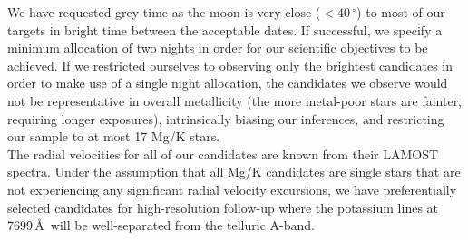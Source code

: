 \documentclass{article}
\begin{document}
\begin{technicalinfo}
We have requested grey time as the moon is very close ($<40\,^\circ$) to most of our targets in bright time between the acceptable dates. If successful,  we specify a minimum allocation of two nights in order for our scientific objectives to be achieved. If we restricted ourselves to observing only the brightest candidates in order to make use of a single night allocation, the candidates we observe would not be representative in overall metallicity (the more metal-poor stars are fainter, requiring longer exposures), intrinsically biasing our inferences, and restricting our sample to at most 17 Mg/K stars.\\


The radial velocities for all of our candidates are known from their LAMOST spectra. Under the assumption that all Mg/K candidates are single stars that are not experiencing any significant radial velocity excursions, we have preferentially selected candidates for high-resolution follow-up where the potassium lines at 7699\,\AA\ will be well-separated from the telluric A-band.
\end{technicalinfo}



\begin{smoka}
\smokacheck
\end{smoka} 





\end{document}
